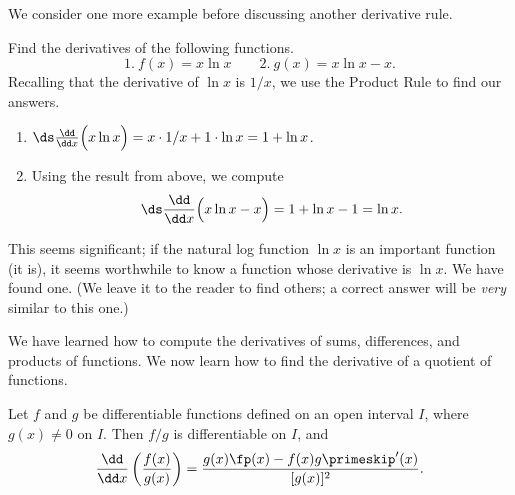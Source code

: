 We consider one more example before discussing another derivative rule.

\begin{example}\label{ex_deriv_ln}
Find the derivatives of the following functions.
\[1.\ f(x) = x\ln x\qquad 2.\ g(x) = x\ln x - x.\]
\solution
Recalling that the derivative of $\ln x$ is $1/x$, we use the Product Rule to find our answers.
\begin{enumerate}
	\item	$\ds \frac{\dd}{\dd x}\Bigl(x\ln x\Bigr) = x\cdot 1/x + 1\cdot \ln x = 1+\ln x$. 
	\item	Using the result from above, we compute
	\[\ds \frac{\dd}{\dd x}\Bigl(x\ln x-x\Bigr) = 1+\ln x-1 = \ln x.\]
\end{enumerate}
This seems significant; if the natural log function $\ln x$ is an important function (it is), it seems worthwhile to know a function whose derivative is $\ln x$. We have found one. (We leave it to the reader to find others; a correct answer will be \emph{very} similar to this one.)
\end{example}

We have learned how to compute the derivatives of sums, differences, and products of functions. We now learn how to find the derivative of a quotient of functions.\bigskip

\begin{theorem}\label{thm:QuotientRule}
Let $f$ and $g$ be differentiable functions defined on an open interval $I$, where $g(x) \neq 0$ on $I$. Then $f/g$ is differentiable on $I$, and
\[\frac{\dd}{\dd x}\left(\frac{f(x)}{g(x)}\right) = \frac{g(x)\fp(x) - f(x)g\primeskip'(x)}{[g(x)]^2}.\]
\end{theorem}


